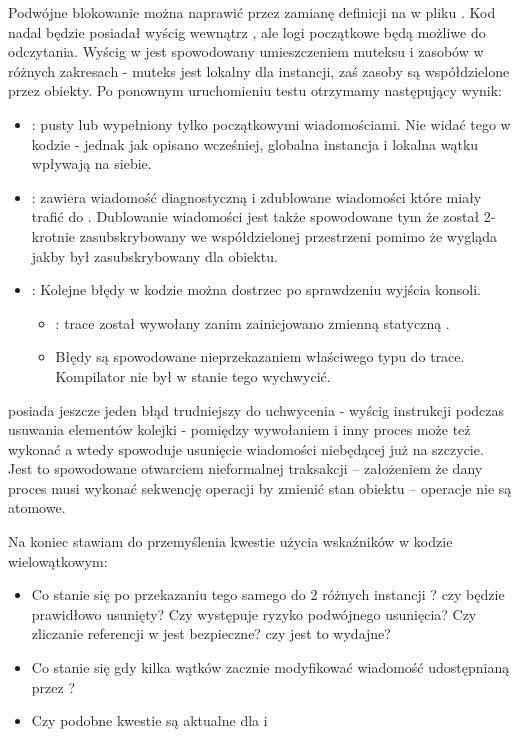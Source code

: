 Podwójne blokowanie można naprawić przez zamianę definicji  na  w pliku . Kod nadal będzie posiadał wyścig wewnątrz , ale logi początkowe będą możliwe do odczytania. Wyścig w  jest spowodowany umieszczeniem muteksu i zasobów w różnych zakresach - muteks jest lokalny dla instancji, zaś zasoby są współdzielone przez obiekty.
Po ponownym uruchomieniu testu otrzymamy następujący wynik:
\begin{itemize}
\item {}: pusty lub wypełniony tylko początkowymi wiadomościami. Nie widać tego w kodzie - jednak jak opisano wcześniej, globalna instancja  i lokalna wątku  wpływają na siebie.
\item {}: zawiera wiadomość diagnostyczną i zdublowane wiadomości które miały trafić do . Dublowanie wiadomości jest także spowodowane tym że  został 2-krotnie zasubskrybowany we współdzielonej przestrzeni pomimo że wygląda jakby był zasubskrybowany dla obiektu.
\item {}: Kolejne błędy w kodzie można dostrzec po sprawdzeniu wyjścia konsoli.
  \begin{itemize}
  \item {}: trace został wywołany zanim zainicjowano zmienną statyczną .
    \item {} Błędy są spowodowane nieprzekazaniem właściwego typu do trace. Kompilator nie był w stanie tego wychwycić.
  \end{itemize}
\end{itemize}

 posiada jeszcze jeden błąd trudniejszy do uchwycenia - wyścig instrukcji podczas usuwania elementów kolejki - pomiędzy wywołaniem  i  inny proces może też wykonać  a wtedy  spowoduje usunięcie wiadomości niebędącej już na szczycie. Jest to spowodowane otwarciem nieformalnej traksakcji -- założeniem że dany proces musi wykonać sekwencję operacji by zmienić stan obiektu -- operacje nie są atomowe.

Na koniec stawiam do przemyślenia kwestie użycia wskaźników w kodzie wielowątkowym:
\begin{itemize}
\item Co stanie się po przekazaniu tego samego  do 2 różnych instancji ? czy będzie prawidłowo usunięty? Czy występuje ryzyko podwójnego usunięcia? Czy zliczanie referencji w  jest bezpieczne? czy jest to wydajne?
\item Co stanie się gdy kilka wątków zacznie modyfikować wiadomość udostępnianą przez ?
\item Czy podobne kwestie są aktualne dla  i 
\end{itemize}

